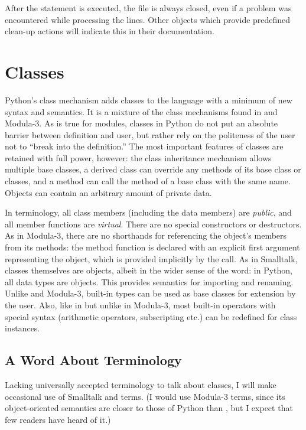 \documentclass{manual}
\begin{document}
After the statement is executed, the file  is always closed,
even if a problem was encountered while processing the lines. Other
objects which provide predefined clean-up actions will indicate
this in their documentation.

\chapter{Classes \label{classes}}

Python's class mechanism adds classes to the language with a minimum
of new syntax and semantics.  It is a mixture of the class mechanisms
found in \Cpp{} and Modula-3.  As is true for modules, classes in Python
do not put an absolute barrier between definition and user, but rather
rely on the politeness of the user not to ``break into the
definition.''  The most important features of classes are retained
with full power, however: the class inheritance mechanism allows
multiple base classes, a derived class can override any methods of its
base class or classes, and a method can call the method of a base class with the
same name.  Objects can contain an arbitrary amount of private data.

In \Cpp{} terminology, all class members (including the data members) are
\emph{public}, and all member functions are \emph{virtual}.  There are
no special constructors or destructors.  As in Modula-3, there are no
shorthands for referencing the object's members from its methods: the
method function is declared with an explicit first argument
representing the object, which is provided implicitly by the call.  As
in Smalltalk, classes themselves are objects, albeit in the wider
sense of the word: in Python, all data types are objects.  This
provides semantics for importing and renaming.  Unlike 
\Cpp{} and Modula-3, built-in types can be used as base classes for
extension by the user.  Also, like in \Cpp{} but unlike in Modula-3, most
built-in operators with special syntax (arithmetic operators,
subscripting etc.) can be redefined for class instances.

\section{A Word About Terminology \label{terminology}}

Lacking universally accepted terminology to talk about classes, I will
make occasional use of Smalltalk and \Cpp{} terms.  (I would use Modula-3
terms, since its object-oriented semantics are closer to those of
Python than \Cpp, but I expect that few readers have heard of it.)
\end{document}
